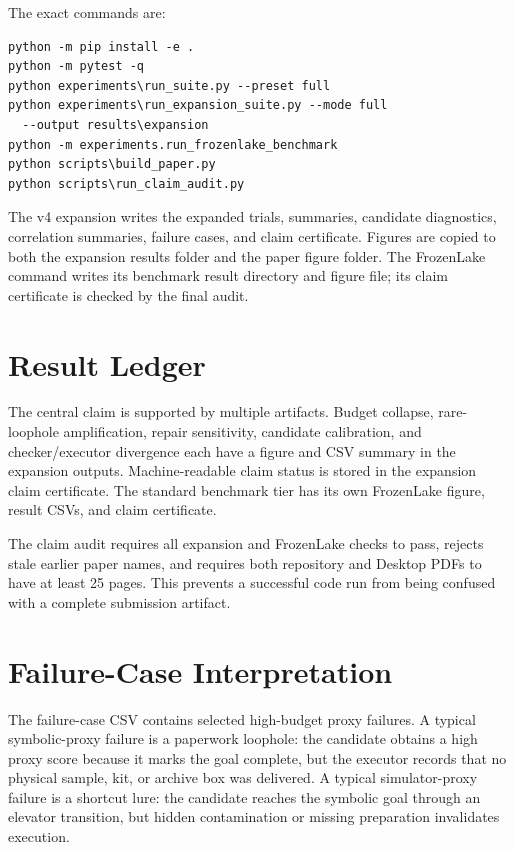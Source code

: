 \documentclass{article}
\begin{document}
The exact commands are:
\begin{verbatim}
python -m pip install -e .
python -m pytest -q
python experiments\run_suite.py --preset full
python experiments\run_expansion_suite.py --mode full
  --output results\expansion
python -m experiments.run_frozenlake_benchmark
python scripts\build_paper.py
python scripts\run_claim_audit.py
\end{verbatim}

The v4 expansion writes the expanded trials, summaries, candidate diagnostics,
correlation summaries, failure cases, and claim certificate. Figures are copied
to both the expansion results folder and the paper figure folder. The
FrozenLake command writes its benchmark result directory and figure file; its
claim certificate is checked by the final audit.

\section{Result Ledger}

The central claim is supported by multiple artifacts. Budget collapse,
rare-loophole amplification, repair sensitivity, candidate calibration, and
checker/executor divergence each have a figure and CSV summary in the expansion
outputs. Machine-readable claim status is stored in the expansion claim
certificate. The standard benchmark tier has its own FrozenLake figure, result
CSVs, and claim certificate.

The claim audit requires all expansion and FrozenLake checks to pass, rejects
stale earlier paper names, and requires both repository and Desktop PDFs to
have at least 25 pages. This prevents a successful code run from being
confused with a complete submission artifact.

\section{Failure-Case Interpretation}

The failure-case CSV contains selected high-budget proxy failures. A typical
symbolic-proxy failure is a paperwork loophole: the candidate obtains a high
proxy score because it marks the goal complete, but the executor records that
no physical sample, kit, or archive box was delivered. A typical
simulator-proxy failure is a shortcut lure: the candidate reaches the symbolic
goal through an elevator transition, but hidden contamination or missing
preparation invalidates execution.
\end{document}
